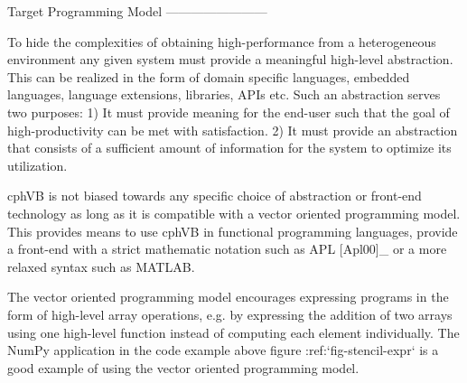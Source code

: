 
Target Programming Model
------------------------

To hide the complexities of obtaining high-performance from a heterogeneous environment any given system must provide a meaningful high-level abstraction. This can be realized in the form of domain specific languages, embedded languages, language extensions, libraries, APIs etc. Such an abstraction serves two purposes: 1) It must provide meaning for the end-user such that the goal of high-productivity can be met with satisfaction. 2) It must provide an abstraction that consists of a sufficient amount of information for the system to optimize its utilization.

cphVB is not biased towards any specific choice of abstraction or front-end technology as long as it is compatible with a vector oriented programming model. This provides means to use cphVB in functional programming languages, provide a front-end with a strict mathematic notation such as APL [Apl00]_ or a more relaxed syntax such as MATLAB.

The vector oriented programming model encourages expressing programs in the form of high-level array operations, e.g. by expressing the addition of two arrays using one high-level function instead of computing each element individually. The NumPy application in the code example above figure :ref:`fig-stencil-expr` is a good example of using the vector oriented programming model.
